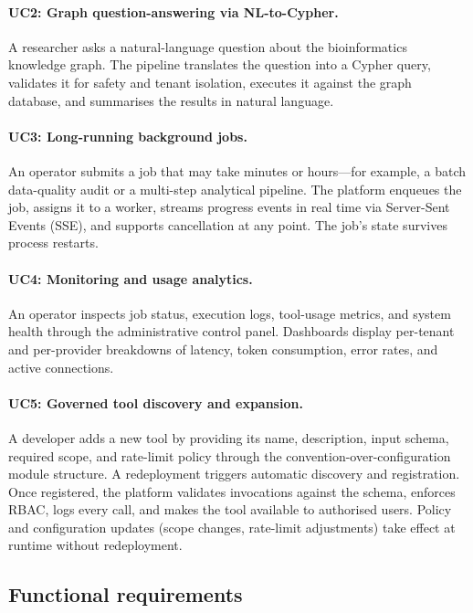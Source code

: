\documentclass[a4paper,noexaminfo]{sapthesis}
\begin{document}
\paragraph{UC2: Graph question-answering via NL-to-Cypher.}
A researcher asks a natural-language question about the bioinformatics
knowledge graph.  The pipeline translates the question into a Cypher query,
validates it for safety and tenant isolation, executes it against the graph
database, and summarises the results in natural language.

\paragraph{UC3: Long-running background jobs.}
An operator submits a job that may take minutes or hours---for example, a
batch data-quality audit or a multi-step analytical pipeline.  The platform
enqueues the job, assigns it to a worker, streams progress events in real
time via Server-Sent Events (SSE), and supports cancellation at any point.
The job's state survives process restarts.

\paragraph{UC4: Monitoring and usage analytics.}
An operator inspects job status, execution logs, tool-usage metrics, and
system health through the administrative control panel.  Dashboards display
per-tenant and per-provider breakdowns of latency, token consumption, error
rates, and active connections.

\paragraph{UC5: Governed tool discovery and expansion.}
A developer adds a new tool by providing its name, description, input
schema, required scope, and rate-limit policy through the
convention-over-configuration module structure.  A redeployment triggers
automatic discovery and registration.  Once registered, the platform
validates invocations against the schema, enforces RBAC, logs every call,
and makes the tool available to authorised users.  Policy and
configuration updates (scope changes, rate-limit adjustments) take effect
at runtime without redeployment.

\subsection{Functional requirements}
\label{sec:functional-requirements}
\end{document}
